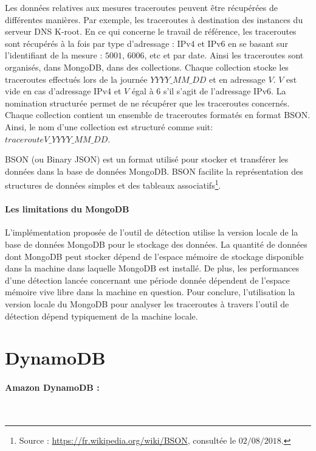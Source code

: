 Les données relatives aux mesures traceroutes peuvent être récupérées de différentes manières. Par exemple,  les traceroutes à destination des instances du serveur DNS K-root. En ce qui concerne le travail de référence, les traceroutes sont récupérés à la fois par type d'adressage : IPv4 et IPv6 en se basant sur  l'identifiant  de la mesure : $ 5001 $, $ 6006 $, etc et par date.  Ainsi les traceroutes sont organisés, dans MongoDB, dans des collections.  Chaque collection stocke les traceroutes effectués lors de la journée $YYYY\_MM\_DD$ et en adressage $V$. $V$ est vide en cas d'adressage IPv4 et $V$ égal à $6$ s'il s'agit de l'adressage IPv6. La nomination structurée permet de ne récupérer que les traceroutes concernés. Chaque collection contient un ensemble de traceroutes formatés en format BSON. Ainsi, le nom d'une collection est structuré comme suit: 	$tracerouteV\_YYYY\_MM\_DD$.

\begin{tcolorbox}
BSON (ou Binary JSON) est un format utilisé pour stocker et transférer les données dans la base de données MongoDB. BSON facilite la représentation des structures de données simples et des tableaux associatifs\footnote{Source : \url{https://fr.wikipedia.org/wiki/BSON}, consultée le $ 02/08/2018 $.}.
\end{tcolorbox}
\paragraph{Les limitations du MongoDB}

L'implémentation proposée de l'outil de détection utilise la version locale de la base de données MongoDB pour le stockage des données.  La quantité de données dont MongoDB peut stocker dépend de l'espace mémoire de stockage disponible dans la machine dans laquelle MongoDB est installé. De plus, les performances d'une détection lancée concernant une période donnée dépendent de l'espace mémoire vive libre dans la machine en question. Pour conclure, l'utilisation la version locale du MongoDB pour analyser les traceroutes à travers l'outil de détection dépend typiquement de la machine locale.


\section{DynamoDB}

 \paragraph{Amazon DynamoDB :}\label{aws:dynmo}~

